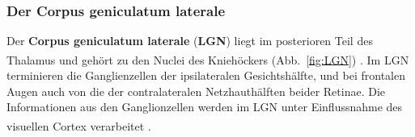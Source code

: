 \newpage
\subsubsection*{Der Corpus geniculatum laterale}

Der \textbf{Corpus geniculatum laterale} (\textbf{LGN})  liegt im posterioren Teil des Thalamus und gehört zu den Nuclei des Kniehöckers (Abb.~\ref{fig:LGN}) \textsuperscript{\cite[Kap.~12]{crossman2014neuroanatomy}}. Im LGN terminieren die Ganglienzellen der ipsilateralen Gesichtshälfte, und bei frontalen Augen auch von die der contralateralen Netzhauthälften beider Retinae. Die Informationen aus den Ganglionzellen werden im LGN unter Einflussnahme des visuellen Cortex verarbeitet
\textsuperscript{\cite[Kap.~8.1]{trepel2011neuroanatomie}}.

